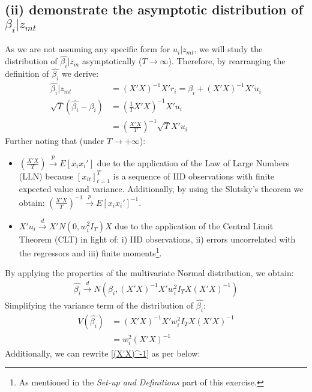 \documentclass[]{article}
\begin{document}
\subsection{(ii) demonstrate the asymptotic distribution of $\beta_i|z_{mt}$}
As we are not assuming any specific form for $u_i|z_{mt}$, we will study the distribution of $\hat{\beta_i}|z_m$ asymptotically ($T \to \infty$). Therefore, by rearranging the definition of $\hat{\beta_i}$ we derive:  
\begin{align*}
	\hat{\beta_i} | z_{mt} &= (X'X)^{-1}X'r_i = \beta_i + (X'X)^{-1}X'u_i \\
	\sqrt{T}(\hat{\beta_i} -\beta_i) &= \left(\frac{1}{T}X'X\right)^{-1}X'u_i \\
	&= (\frac{X'X}{T})^{-1}\sqrt{T}X'u_i 
\end{align*}
Further noting that (under $T \to +\infty$):
\begin{itemize}
	\item $(\frac{X'X}{T}) \overset{p}{\to} E[x_ix_i']$ due to the application of the Law of Large Numbers (LLN) because $[x_{it}]_{t=1}^T$ is a sequence of IID observations with finite expected value and variance. Additionally, by using the Slutsky's theorem we obtain: $(\frac{X'X}{T})^{-1} \overset{p}{\to} E[x_ix_i']^{-1}$. 	
	\item $X'u_i \overset{d}{\to} X'N(0,w_i^2I_T)X$ due to the application of the Central Limit Theorem (CLT) in light of: i) IID observations, ii) errors uncorrelated with the regressors and iii) finite moments\footnote{As mentioned in the \textit{Set-up and Definitions} part of this exercise.}.
\end{itemize}
By applying the properties of the multivariate Normal distribution, we obtain:
\begin{align*}
	\hat{\beta_i} \overset{d}{\to} N(\beta_i, (X'X)^{-1}X'w_i^2I_TX(X'X)^{-1})
\end{align*}
Simplifying the variance term of the distribution of $\hat{\beta_i}$:
\begin{align*}
	V(\hat{\beta_i}) &= (X'X)^{-1}X'w_i^2I_TX(X'X)^{-1} \\
	&= w_i^2 (X'X)^{-1}
\end{align*}
Additionally, we can rewrite \ref{(X'X)^-1} as per below:
\end{document}
